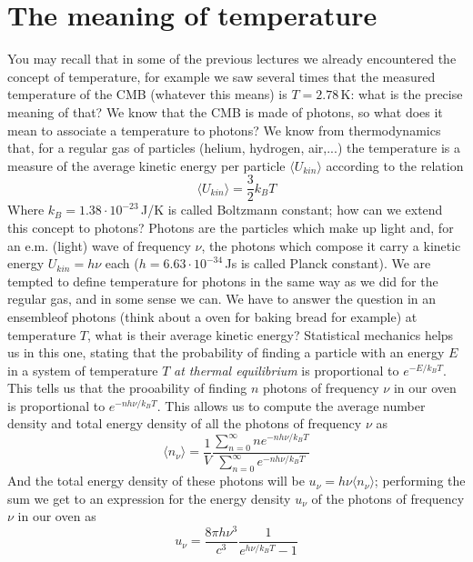 \documentclass[11pt, a4paper,oneside,openright]{book}
\numberwithin{equation}{section}
\begin{document}
\section{The meaning of temperature}
You may recall that in some of the previous lectures we already encountered the concept of temperature, for example we saw several times that the measured temperature of the CMB (whatever this means) is $T=2.78$\,K: what is the precise meaning of that? We know that the CMB is made of photons, so what does it mean to associate a temperature to photons? We know from thermodynamics that, for a regular gas of particles (helium, hydrogen, air,...) the temperature is a measure of the average kinetic energy per particle $\langle U_{kin}\rangle$ according to the relation
\begin{equation}
\langle U_{kin}\rangle =\frac{3}{2}k_BT
\end{equation}
Where $k_B=1.38\cdot 10^{-23}$\,J/K is called Boltzmann constant; how can we extend this concept to photons? Photons are the particles which make up light and, for an e.m. (light) wave of frequency $\nu$, the photons which compose it carry a kinetic energy $U_{kin}=h\nu$ each ($h=6.63\cdot 10^{-34}$\,Js is called Planck constant). We are tempted to define temperature for photons in the same way as we did for the regular gas, and in some sense we can. We have to answer the question in an ensembleof photons (think about a oven for baking bread for example) at temperature $T$, what is their average kinetic energy? Statistical mechanics helps us in this one, stating that the probability of finding a particle with an energy $E$ in a system of temperature $T$ \textit{at thermal equilibrium} is proportional to $e^{-E/k_BT}$. This tells us that the prooability of finding $n$ photons of frequency $\nu$ in our oven is proportional to $e^{-nh\nu/k_BT}$. This allows us to compute the average number density and total 
energy density of all the photons of frequency $\nu$ as 
\begin{equation}
\langle n_\nu\rangle=\frac{1}{V}\frac{\sum_{n=0}^{\infty}ne^{-nh\nu/k_BT}}{\sum_{n=0}^{\infty}e^{-nh\nu/k_BT}}
\end{equation}
And the total energy density of these photons will be $u_\nu=h\nu \langle n_\nu\rangle$; performing the sum we get to an expression for the energy density $u_\nu$ of the photons of frequency $\nu$ in our oven as 
\begin{equation}
\label{planck}
u_\nu=\frac{8\pi h\nu^3}{c^3}\frac{1}{e^{h\nu/k_BT}-1}
\end{equation}
\end{document}
